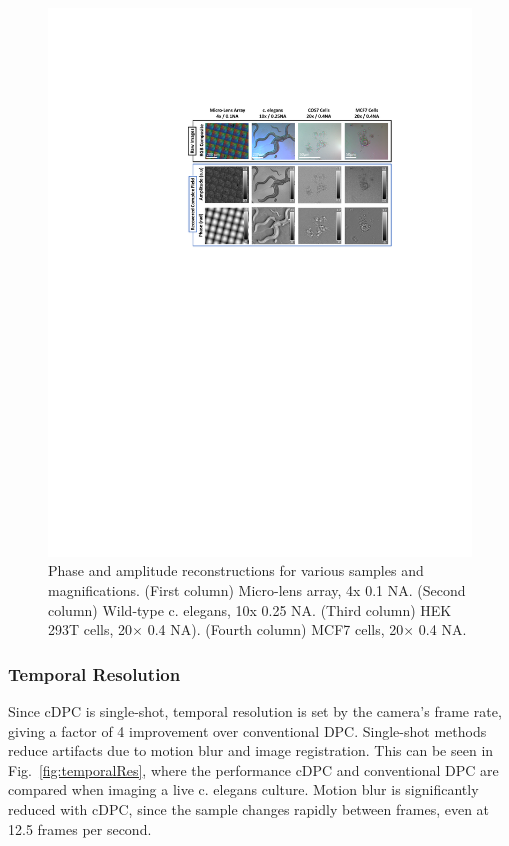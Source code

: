 \begin{figure}[ph]
\centering
\includegraphics[width=1\textwidth]{figures/fig_cdpc_video.pdf}
\caption{\label{fig:mosaic}
Phase and amplitude reconstructions for various samples and magnifications. (First column) Micro-lens array, 4x 0.1 NA. (Second column) Wild-type c. elegans, 10x 0.25 NA. (Third column) HEK 293T cells, 20$\times$ 0.4 NA). (Fourth column) MCF7 cells, 20$\times$ 0.4 NA.}
\end{figure}

\subsubsection{Temporal Resolution}
Since cDPC is single-shot, temporal resolution is set by the camera's frame rate, giving a factor of 4 improvement over conventional DPC. Single-shot methods reduce artifacts due to motion blur and image registration. This can be seen in Fig.~\ref{fig:temporalRes}, where the performance cDPC and conventional DPC are compared when imaging a live c. elegans culture. Motion blur is significantly reduced with cDPC, since the sample changes rapidly between frames, even at 12.5 frames per second.

